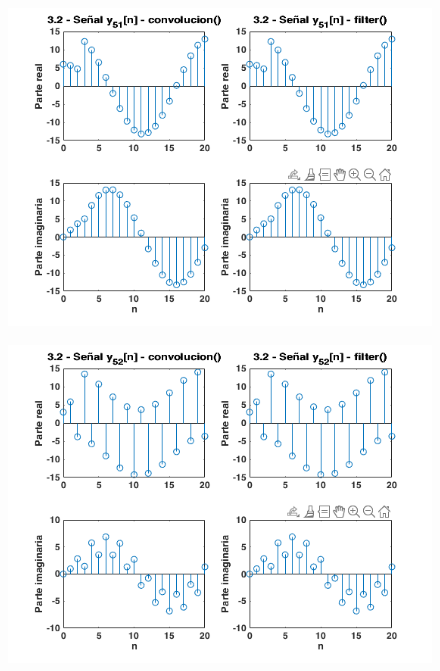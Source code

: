\documentclass{article}
\begin{document}
\begin{figure} \caption[Figura 12]{}
	\centering
	\includegraphics[width=\linewidth]{./Figures/12.png}
\end{figure}

\begin{figure} \caption[Figura 13]{}
	\centering
	\includegraphics[width=\linewidth]{./Figures/13.png}
\end{figure}
\end{document}
